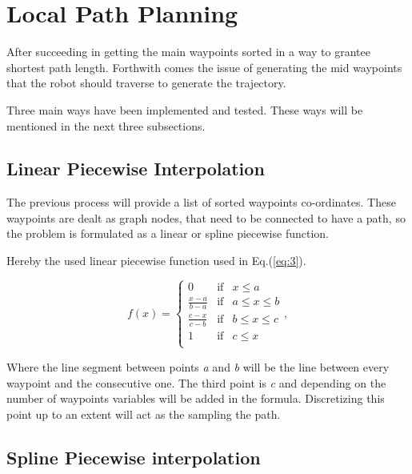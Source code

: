 \section{Local Path Planning} \label{local_path_planning}

After succeeding in getting the main waypoints sorted in a way to grantee shortest path length. Forthwith comes the issue of generating the mid waypoints that the robot should traverse to generate the trajectory.

Three main ways have been implemented and tested. These ways will be mentioned in the next three subsections.

\subsection{Linear Piecewise Interpolation}
The previous process will provide a list of sorted  waypoints co-ordinates. These waypoints are dealt as graph nodes, that need to be connected to have a path, so the problem is formulated as a linear or spline piecewise function.

 Hereby the used linear piecewise function used in Eq.(\ref{eq:3}).

\begin{equation} \label{eq:3}
f(x)=
\left\lbrace
\begin{array}{ccc}
0  & \mbox{if} & x\leq a\\
\frac{x-a}{b-a} & \mbox{if} & a\leq x\leq b \\
\frac{c-x}{c-b} & \mbox{if} & b\leq x\leq c \\
1  & \mbox{if} & c\leq  x \\
\end{array}\right.  ,
\end{equation}

\noindent 
Where the line segment between points \textit{a} and \textit{b} will be the line between every waypoint and the consecutive one. The third point is \textit{c} and depending on the number of waypoints variables will be added in the formula. Discretizing this point up to an extent will act as the sampling the path. %





\subsection{Spline Piecewise interpolation }


